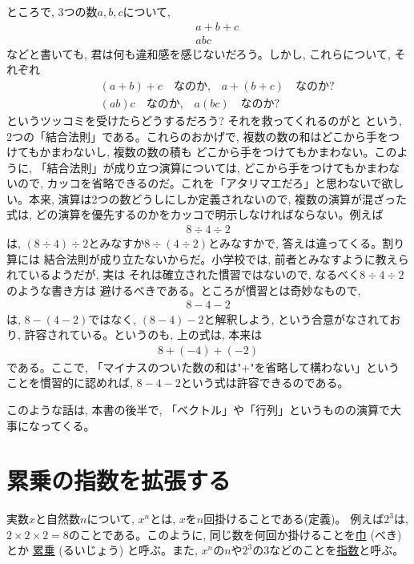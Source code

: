 ところで, 3つの数$a, b, c$について, 
\begin{eqnarray}
&&a+b+c\\
&&abc
\end{eqnarray}
などと書いても, 君は何も違和感を感じないだろう。しかし, これらについて, それぞれ
\begin{eqnarray*}
&&(a+b)+c\text{　なのか,　}a+(b+c)\text{　なのか?}\\
&&(ab)c\text{　なのか,　}a(bc)\text{　なのか?}
\end{eqnarray*}
というツッコミを受けたらどうするだろう? それを救ってくれるのがと
という, 2つの「結合法則」である。これらのおかげで, 複数の数の和はどこから手をつけてもかまわないし, 複数の数の積も
どこから手をつけてもかまわない。このように, 「結合法則」が成り立つ演算については, どこから手をつけてもかまわないので, 
カッコを省略できるのだ。これを「アタリマエだろ」と思わないで欲しい。本来, 演算は2つの数どうしにしか定義されないので, 複数の演算が混ざった式は, 
どの演算を優先するのかをカッコで明示しなければならない。例えば
\begin{eqnarray}
8\div 4\div 2
\end{eqnarray}
は, $(8\div 4)\div 2$とみなすか$8\div (4\div 2)$とみなすかで, 答えは違ってくる。割り算には
結合法則が成り立たないからだ。小学校では, 前者とみなすように教えられているようだが, 実は
それは確立された慣習ではないので, なるべく$8\div 4\div 2$のような書き方は
避けるべきである。ところが慣習とは奇妙なもので, 
\begin{eqnarray}
8 - 4 - 2
\end{eqnarray}
は, $8-(4-2)$ではなく, $(8-4)-2$と解釈しよう, という合意がなされており, 許容されている。というのも, 
上の式は, 本来は
\begin{eqnarray}
8 +(-4)+(-2)
\end{eqnarray}
である。ここで, 「マイナスのついた数の和は"+"を省略して構わない」ということを慣習的に認めれば, 
$8 - 4 - 2$という式は許容できるのである。

このような話は, 本書の後半で, 「ベクトル」や「行列」というものの演算で大事になってくる。\\


\section{累乗の指数を拡張する}

実数$x$と自然数$n$について, $x^n$とは, $x$を$n$回掛けることである(定義)。
例えば$2^3$は, $2 \times 2 \times 2=8$のことである。このように, 
同じ数を何回か掛けることを\underline{巾} (べき)とか
\underline{累乗} (るいじょう)
と呼ぶ。また, $x^n$の$n$や$2^3$の3などのことを\underline{指数}と呼ぶ。

